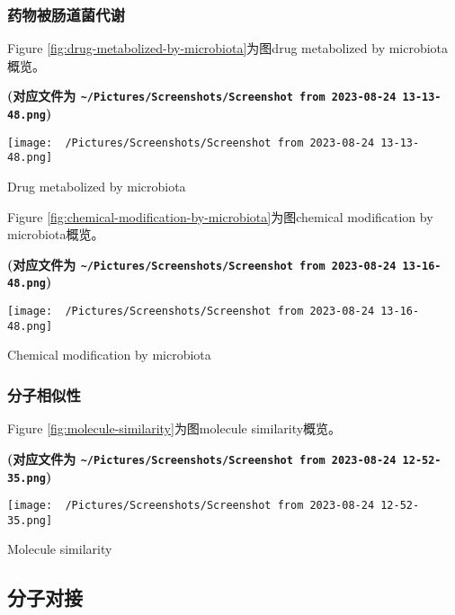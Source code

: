 \documentclass[
]{article}
\begin{document}
\hypertarget{ux836fux7269ux88abux80a0ux9053ux83ccux4ee3ux8c22}{%
\subsubsection{药物被肠道菌代谢}\label{ux836fux7269ux88abux80a0ux9053ux83ccux4ee3ux8c22}}

Figure \ref{fig:drug-metabolized-by-microbiota}为图drug metabolized by microbiota概览。

\textbf{(对应文件为 \texttt{\textasciitilde{}/Pictures/Screenshots/Screenshot\ from\ 2023-08-24\ 13-13-48.png})}

\def\@captype{figure}
\begin{center}
\texttt{[image: ~/Pictures/Screenshots/Screenshot from 2023-08-24 13-13-48.png]}
\caption{Drug metabolized by microbiota}\label{fig:drug-metabolized-by-microbiota}
\end{center}

Figure \ref{fig:chemical-modification-by-microbiota}为图chemical modification by microbiota概览。

\textbf{(对应文件为 \texttt{\textasciitilde{}/Pictures/Screenshots/Screenshot\ from\ 2023-08-24\ 13-16-48.png})}

\def\@captype{figure}
\begin{center}
\texttt{[image: ~/Pictures/Screenshots/Screenshot from 2023-08-24 13-16-48.png]}
\caption{Chemical modification by microbiota}\label{fig:chemical-modification-by-microbiota}
\end{center}

\hypertarget{ux5206ux5b50ux76f8ux4f3cux6027}{%
\subsubsection{分子相似性}\label{ux5206ux5b50ux76f8ux4f3cux6027}}

Figure \ref{fig:molecule-similarity}为图molecule similarity概览。

\textbf{(对应文件为 \texttt{\textasciitilde{}/Pictures/Screenshots/Screenshot\ from\ 2023-08-24\ 12-52-35.png})}

\def\@captype{figure}
\begin{center}
\texttt{[image: ~/Pictures/Screenshots/Screenshot from 2023-08-24 12-52-35.png]}
\caption{Molecule similarity}\label{fig:molecule-similarity}
\end{center}

\hypertarget{ux5206ux5b50ux5bf9ux63a5}{%
\subsection{分子对接}\label{ux5206ux5b50ux5bf9ux63a5}}
\end{document}
